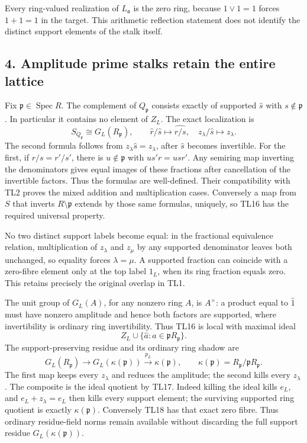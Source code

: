 Every ring-valued realization of \(L_{\mathfrak a}\) is the zero ring,
because \(1\vee1=1\) forces \(1+1=1\) in the target. This arithmetic
reflection statement does not identify the distinct support elements of
the stalk itself.

\subsection{4. Amplitude prime stalks retain the entire
lattice}\label{amplitude-prime-stalks-retain-the-entire-lattice}

Fix \(\mathfrak p\in\operatorname{Spec}R\). The complement of
\(Q_{\mathfrak p}\) consists exactly of supported \(\widehat s\) with
\(s\notin\mathfrak p\). In particular it contains no element of \(Z_L\).
The exact localization is \[
 \boxed{S_{Q_{\mathfrak p}}\cong G_L(R_{\mathfrak p}),\qquad
 \widehat r/\widehat s\mapsto\widehat{r/s},\quad
 z_\lambda/\widehat s\mapsto z_\lambda.}
 \tag{TL16}
\] The second formula follows from \(z_\lambda\widehat s=z_\lambda\),
after \(\widehat s\) becomes invertible. For the first, if
\(r/s=r'/s'\), there is \(u\notin\mathfrak p\) with \(us'r=usr'\). Any
semiring map inverting the denominators gives equal images of these
fractions after cancellation of the invertible factors. Thus the
formulas are well-defined. Their compatibility with TL2 proves the mixed
addition and multiplication cases. Conversely a map from \(S\) that
inverts \(R\setminus\mathfrak p\) extends by those same formulas,
uniquely, so TL16 has the required universal property.

No two distinct support labels become equal: in the fractional
equivalence relation, multiplication of \(z_\lambda\) and \(z_\mu\) by
any supported denominator leaves both unchanged, so equality forces
\(\lambda=\mu\). A supported fraction can coincide with a zero-fibre
element only at the top label \(1_L\), when its ring fraction equals
zero. This retains precisely the original overlap in TL1.

The unit group of \(G_L(A)\), for any nonzero ring \(A\), is
\(A^\times\): a product equal to \(\widehat1\) must have nonzero
amplitude and hence both factors are supported, where invertibility is
ordinary ring invertibility. Thus TL16 is local with maximal ideal \[
 Z_L\cup\{\widehat a:a\in\mathfrak pR_{\mathfrak p}\}.
 \tag{TL17}
\] The support-preserving residue and its ordinary ring shadow are \[
 G_L(R_{\mathfrak p})\longrightarrow G_L(\kappa(\mathfrak p))
 \xrightarrow{p_L}\kappa(\mathfrak p),
 \qquad\kappa(\mathfrak p)=R_{\mathfrak p}/\mathfrak pR_{\mathfrak p}.
 \tag{TL18}
\] The first map keeps every \(z_\lambda\) and reduces the amplitude;
the second kills every \(z_\lambda\). The composite is the ideal
quotient by TL17. Indeed killing the ideal kills \(e_L\), and
\(e_L+z_\lambda=e_L\) then kills every support element; the surviving
supported ring quotient is exactly \(\kappa(\mathfrak p)\). Conversely
TL18 has that exact zero fibre. Thus ordinary residue-field norms remain
available without discarding the full support residue
\(G_L(\kappa(\mathfrak p))\).

